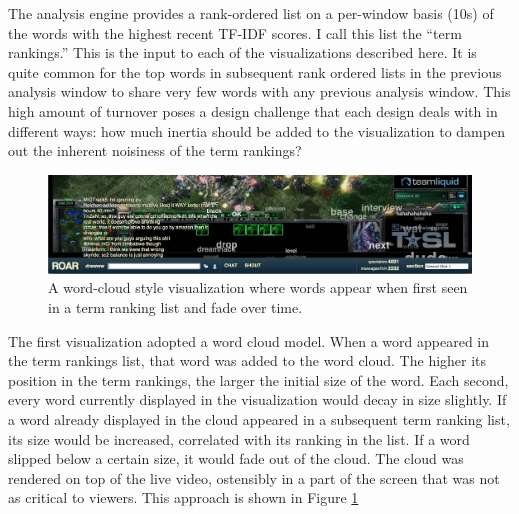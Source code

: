 The analysis engine provides a rank-ordered list on a per-window basis (10s) of the words with the highest recent TF-IDF scores. I call this list the ``term rankings.''  This is the input to each of the visualizations described here. It is quite common for the top words in subsequent rank ordered lists in the previous analysis window to share very few words with any previous analysis window. This high amount of turnover poses a design challenge that each design deals with in different ways: how much inertia should be added to the visualization to dampen out the inherent noisiness of the term rankings? 


\begin{figure}[tb]
	\includegraphics{figures/roar/cloud.png}
	\caption{A word-cloud style visualization where words appear when first seen in a term ranking list and fade over time.}
	\label{fig:pulse_word_cloud}
\end{figure}


The first visualization adopted a word cloud model. When a word appeared in the term rankings list, that word was added to the word cloud. The higher its position in the term rankings, the larger the initial size of the word. Each second, every word currently displayed in the visualization would decay in size slightly. If a word already displayed in the cloud appeared in a subsequent term ranking list, its size would be increased, correlated with its ranking in the list. If a word slipped below a certain size, it would fade out of the cloud. The cloud was rendered on top of the live video, ostensibly in a part of the screen that was not as critical to viewers. This approach is shown in Figure \ref{fig:pulse_word_cloud}

